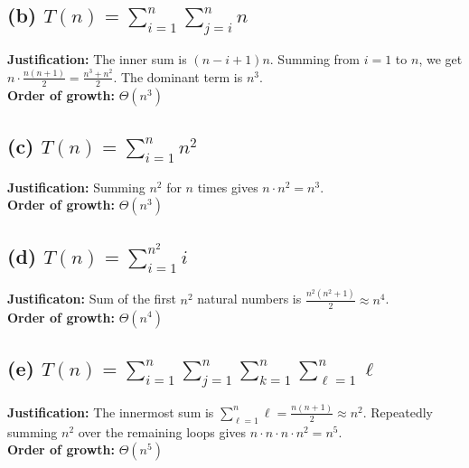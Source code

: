 \documentclass{article}
\begin{document}
\subsection*{(b) \( T(n) = \sum_{i=1}^{n} \sum_{j=i}^{n} n \)}
\textbf{Justification:} The inner sum is \((n-i+1)n\). Summing from \(i=1\) to \(n\), we get \( n \cdot \frac{n(n+1)}{2} = \frac{n^3 + n^2}{2} \). The dominant term is \( n^3 \).
\\ \textbf{Order of growth:} \( \Theta(n^3) \)

\subsection*{(c) \( T(n) = \sum_{i=1}^{n} n^2 \)}
\textbf{Justification:} Summing \( n^2 \) for \( n \) times gives \( n \cdot n^2 = n^3 \).
\\ \textbf{Order of growth:} \( \Theta(n^3) \)

\subsection*{(d) \( T(n) = \sum_{i=1}^{n^2} i \)}
\textbf{Justificaton:} Sum of the first \(n^2\) natural numbers is \( \frac{n^2(n^2 + 1)}{2} \approx n^4 \).
\\ \textbf{Order of growth:} \( \Theta(n^4) \)

\subsection*{(e) \( T(n) = \sum_{i=1}^{n} \sum_{j=1}^{n} \sum_{k=1}^{n} \sum_{\ell=1}^{n} \ell \)}
\textbf{Justification:} The innermost sum is \( \sum_{\ell=1}^{n} \ell = \frac{n(n+1)}{2} \approx n^2 \). Repeatedly summing \( n^2 \) over the remaining loops gives \( n \cdot n \cdot n \cdot n^2 = n^5 \).
\\ \textbf{Order of growth:} \( \Theta(n^5) \)
\end{document}
